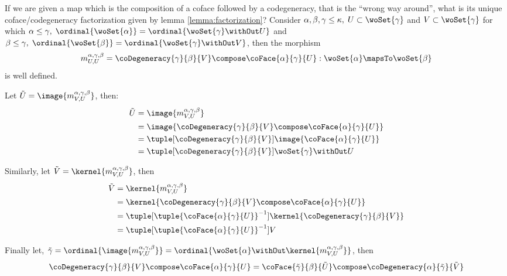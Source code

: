 If we are given a map which is the composition of a coface followed by a codegeneracy, that 
is the ``wrong way around'', what is its unique coface/codegeneracy factorization given by 
lemma \ref{lemma:factorization}?  Consider $\alpha, \beta, \gamma \leq \kappa, \; U \subset 
\woSet{\gamma}$ and $V \subset \woSet{\gamma}$ for which $\alpha \leq \gamma, \; 
\ordinal{\woSet{\alpha}} = \ordinal{\woSet{\gamma}\withOut U}$ and $\beta \leq \gamma, \; 
\ordinal{\woSet{\beta}} = \ordinal{\woSet{\gamma}\withOut V}$, then the morphism 
$$m^{\alpha,\gamma,\beta}_{U,U} = \coDegeneracy{\gamma}{\beta}{V} \compose 
\coFace{\alpha}{\gamma}{U} : \woSet{\alpha} \mapsTo \woSet{\beta}$$ is well defined. 

Let $\tilde{U} = \image{m^{\alpha,\gamma,\beta}_{V,U}}$, then:
\begin{align*}
\tilde{U} & = \image{m^{\alpha,\gamma,\beta}_{V,U}} \\
  & = \image{ \coDegeneracy{\gamma}{\beta}{V} \compose \coFace{\alpha}{\gamma}{U}} \\
  & = \tuple[\coDegeneracy{\gamma}{\beta}{V}]{\image{\coFace{\alpha}{\gamma}{U}}} \\
  & = \tuple[\coDegeneracy{\gamma}{\beta}{V}]{\woSet{\gamma} \withOut U}
\end{align*}

Similarly, let $\tilde{V} = \kernel{m^{\alpha,\gamma,\beta}_{V,U}}$, then
\begin{align*}
\tilde{V} & = \kernel{m^{\alpha,\gamma,\beta}_{V,U}} \\
  & = \kernel{ \coDegeneracy{\gamma}{\beta}{V} \compose \coFace{\alpha}{\gamma}{U}} \\
  & = 
  \tuple[\tuple{\coFace{\alpha}{\gamma}{U}}^{-1}]{\kernel{\coDegeneracy{\gamma}{\beta}{V}}} 
  \\
  & = \tuple[\tuple{\coFace{\alpha}{\gamma}{U}}^{-1}]{V}
\end{align*}

Finally let, $\tilde{\gamma} = \ordinal{\image{m^{\alpha,\gamma,\beta}_{V,U}}} = 
\ordinal{\woSet{\alpha}\withOut \kernel{m^{\alpha,\gamma,\beta}_{V,U}}}$, then
\begin{equation*}
\coDegeneracy{\gamma}{\beta}{V} \compose \coFace{\alpha}{\gamma}{U} = 
\coFace{\tilde{\gamma}}{\beta}{\tilde{U}} \compose 
\coDegeneracy{\alpha}{\tilde{\gamma}}{\tilde{V}}
\end{equation*}


